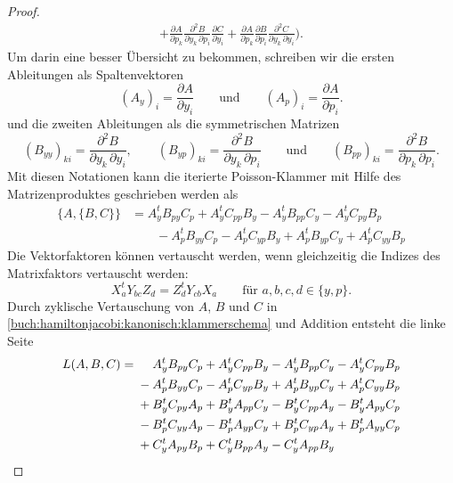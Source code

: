 \begin{proof}
\begin{align*}
+
\frac{\partial A}{\partial p_k}
\frac{\partial^2 B}{\partial y_k\,\partial p_i}
\frac{\partial C}{\partial y_i}
+
\frac{\partial A}{\partial p_k}
\frac{\partial B}{\partial p_i}
\frac{\partial^2 C}{\partial y_k\,\partial y_i}
\bigg).
\end{align*}
Um darin eine besser Übersicht zu bekommen, schreiben wir die ersten
Ableitungen als Spaltenvektoren
\[
(A_y)_i = \frac{\partial A}{\partial y_i}
\qquad\text{und}\qquad
(A_p)_i = \frac{\partial A}{\partial p_i}.
\]
und die zweiten Ableitungen als die symmetrischen Matrizen
\[
(B_{yy})_{ki} = \frac{\partial^2 B}{\partial y_k\,\partial y_i}
,
\qquad
(B_{yp})_{ki} = \frac{\partial^2 B}{\partial y_k\,\partial p_i}
\qquad\text{und}\qquad
(B_{pp})_{ki} = \frac{\partial^2 B}{\partial p_k\,\partial p_i}.
\]
Mit diesen Notationen
kann die iterierte Poisson-Klammer mit Hilfe des Matrizenproduktes
geschrieben werden als
\begin{equation}
\begin{aligned}
\{A,\{B,C\}\}
&=
A_y^tB_{py}C_p
+
A_y^tC_{pp}B_y
-
A_y^tB_{pp}C_y
-
A_y^tC_{py}B_p
\\
&\qquad
-
A_p^tB_{yy}C_p
-
A_p^tC_{yp}B_y
+
A_p^tB_{yp}C_y
+
A_p^tC_{yy}B_p
\end{aligned}
\label{buch:hamiltonjacobi:kanonisch:klammerschema}
\end{equation}
Die Vektorfaktoren können vertauscht werden, wenn gleichzeitig die
Indizes des Matrixfaktors vertauscht werden:
\begin{equation}
X_a^t Y_{bc} Z_d
=
Z_d^t Y_{cb} X_a
\qquad
\text{für $a,b,c,d\in \{y,p\}$.}
\label{buch:hamiltonjacobi:kanonisch:eqn:xyz}
\end{equation}
Durch zyklische Vertauschung von $A$, $B$ und $C$ in
\eqref{buch:hamiltonjacobi:kanonisch:klammerschema} und
Addition entsteht die linke Seite
\begin{align*}
L(A,B,C)
&=
\mathstrut\phantom{\mathstrut-\mathstrut}
A_y^tB_{py}C_p
+
A_y^tC_{pp}B_y
-
A_y^tB_{pp}C_y
-
A_y^tC_{py}B_p
\\
&\phantom{\mathstrut=\mathstrut}
-
A_p^tB_{yy}C_p
-
A_p^tC_{yp}B_y
+
A_p^tB_{yp}C_y
+
A_p^tC_{yy}B_p
\\
&\phantom{\mathstrut=\mathstrut}
+
B_y^tC_{py}A_p
+
B_y^tA_{pp}C_y
-
B_y^tC_{pp}A_y
-
B_y^tA_{py}C_p
\\
&\phantom{\mathstrut=\mathstrut}
-
B_p^tC_{yy}A_p
-
B_p^tA_{yp}C_y
+
B_p^tC_{yp}A_y
+
B_p^tA_{yy}C_p
\\
&\phantom{\mathstrut=\mathstrut}
+
C_y^tA_{py}B_p
+
C_y^tB_{pp}A_y
-
C_y^tA_{pp}B_y

\end{align*}
\end{proof}
